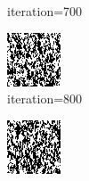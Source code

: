 \documentclass{article}
\begin{document}
\begin{figure}[h]
\begin{subfigure}[t]{0.18\textwidth}
\vspace{-0.6cm}
\caption{iteration=700}
\end{subfigure}\hspace{0.01\textwidth}
\begin{subfigure}[t]{0.18\textwidth}
\centering
\includegraphics[width=\textwidth]{./computational/results/gibbs_comb_sampler_negative_iter_800.png}
\vspace{-0.6cm}
\caption{iteration=800}
\end{subfigure}\hspace{0.01\textwidth}
\begin{subfigure}[t]{0.18\textwidth}
\centering
\includegraphics[width=\textwidth]{./computational/results/gibbs_comb_sampler_negative_iter_900.png}

\end{subfigure}
\end{figure}
\end{document}
